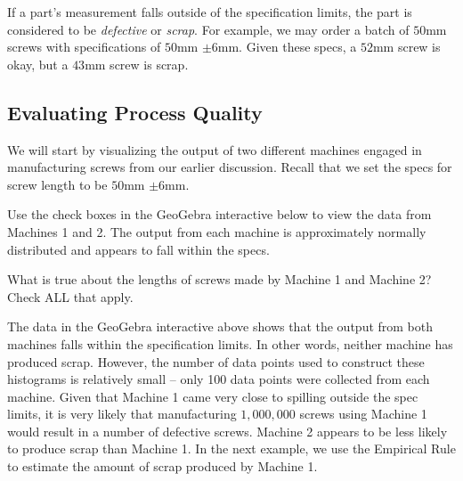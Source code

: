 \documentclass{ximera}
\begin{document}
If a part's measurement falls outside of the specification limits, the part is considered to be \emph{defective} or \emph{scrap}.  For example, we may order a batch of $50$mm screws with specifications of $50$mm $\pm 6$mm.   Given these specs, a $52$mm screw is okay, but a $43$mm screw is scrap.

\subsection*{Evaluating Process Quality}
We will start by visualizing the output of two different machines engaged in manufacturing screws from our earlier discussion.  Recall that we set the specs for screw length to be $50$mm $\pm 6$mm.  

Use the check boxes in the GeoGebra interactive below to view the data from Machines 1 and 2.  The output from each machine is approximately normally distributed and appears to fall within the specs.  

\begin{onlineOnly}
\begin{center} 
\end{center}
\end{onlineOnly}

\begin{question}\label{quest:compareMachines}
    What is true about the lengths of screws made by Machine 1 and Machine 2?  Check ALL that apply.
    \begin{selectAll}
            \end{selectAll}
\end{question}

The data in the GeoGebra interactive above shows that the output from both machines falls within the specification limits.  In other words, neither machine has produced scrap.  However, the number of data points used to construct these histograms is relatively small -- only 100 data points were collected from each machine.  Given that Machine 1 came very close to spilling outside the spec limits, it is very likely that manufacturing $1,000,000$ screws using Machine 1 would result in a number of defective screws.  Machine 2 appears to be less likely to produce scrap than Machine 1.  In the next example, we use the Empirical Rule to estimate the amount of scrap produced by Machine 1.    
\end{document}

